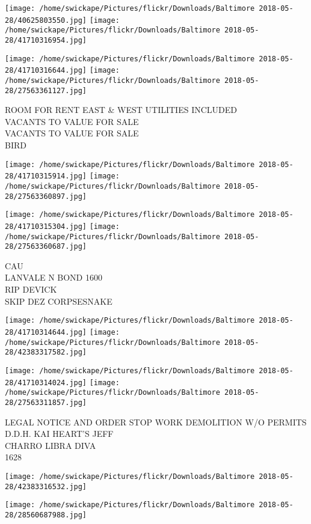 \documentclass[10pt,letterpaper]{article}
\begin{document}
\texttt{[image: /home/swickape/Pictures/flickr/Downloads/Baltimore 2018-05-28/40625803550.jpg]}
\texttt{[image: /home/swickape/Pictures/flickr/Downloads/Baltimore 2018-05-28/41710316954.jpg]}

\texttt{[image: /home/swickape/Pictures/flickr/Downloads/Baltimore 2018-05-28/41710316644.jpg]}
\texttt{[image: /home/swickape/Pictures/flickr/Downloads/Baltimore 2018-05-28/27563361127.jpg]}

ROOM FOR RENT EAST \& WEST UTILITIES INCLUDED\\
VACANTS TO VALUE FOR SALE\\
VACANTS TO VALUE FOR SALE\\
BIRD
\pagebreak

\texttt{[image: /home/swickape/Pictures/flickr/Downloads/Baltimore 2018-05-28/41710315914.jpg]}
\texttt{[image: /home/swickape/Pictures/flickr/Downloads/Baltimore 2018-05-28/27563360897.jpg]}

\texttt{[image: /home/swickape/Pictures/flickr/Downloads/Baltimore 2018-05-28/41710315304.jpg]}
\texttt{[image: /home/swickape/Pictures/flickr/Downloads/Baltimore 2018-05-28/27563360687.jpg]}

CAU\\
LANVALE N BOND 1600\\
RIP DEVICK\\
SKIP DEZ CORPSESNAKE
\pagebreak

\texttt{[image: /home/swickape/Pictures/flickr/Downloads/Baltimore 2018-05-28/41710314644.jpg]}
\texttt{[image: /home/swickape/Pictures/flickr/Downloads/Baltimore 2018-05-28/42383317582.jpg]}

\texttt{[image: /home/swickape/Pictures/flickr/Downloads/Baltimore 2018-05-28/41710314024.jpg]}
\texttt{[image: /home/swickape/Pictures/flickr/Downloads/Baltimore 2018-05-28/27563311857.jpg]}

LEGAL NOTICE AND ORDER STOP WORK DEMOLITION W/O PERMITS\\
D.D.H. KAI HEART'S JEFF\\
CHARRO LIBRA DIVA\\
1628
\pagebreak

\texttt{[image: /home/swickape/Pictures/flickr/Downloads/Baltimore 2018-05-28/42383316532.jpg]}

\vspace{0.25in}
\texttt{[image: /home/swickape/Pictures/flickr/Downloads/Baltimore 2018-05-28/28560687988.jpg]}
\end{document}
